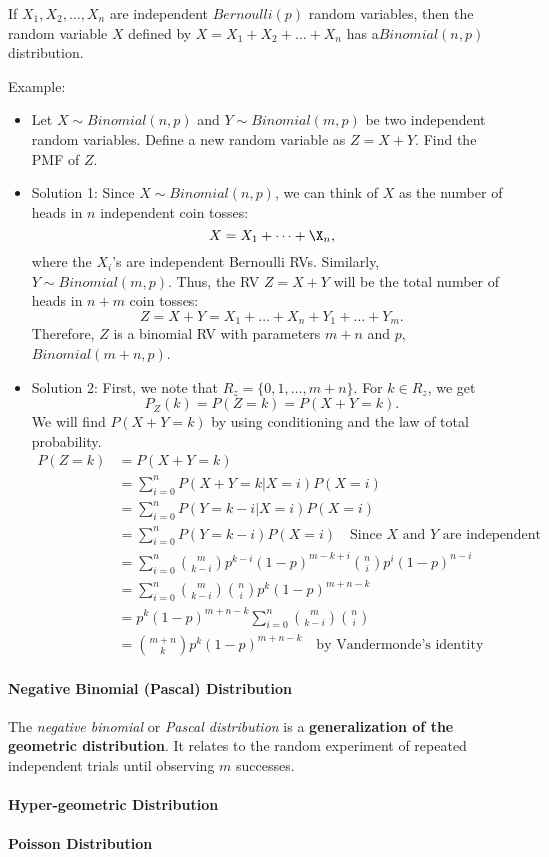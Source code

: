 If $X_1,X_2,\dots,X_n$ are independent $Bernoulli(p)$ random variables, then the random variable $X$ defined by $X=X_1+X_2+\dots+X_n$ has a$Binomial(n,p)$ distribution. 


Example: 
\begin{itemize}
	\item Let $X\sim Binomial(n,p)$ and $Y\sim Binomial(m,p)$ be two independent random variables. Define a new random variable as $Z=X+Y$. Find the PMF of $Z$.
	\item Solution 1: Since $X\sim Binomial(n,p)$, we can think of $X$ as the number of heads in $n$ independent coin tosses: 
	$$X = X_1+\dots+\X_n,$$
	where the $X_i$'s are independent Bernoulli RVs. Similarly, $Y\sim Binomial(m,p)$.
	Thus, the RV $Z=X+Y$ will be the total number of heads in $n+m$ coin tosses:
	$$Z = X+Y=X_1+\dots+X_n+Y_1+\dots+Y_m.$$
	Therefore, $Z$ is a binomial RV with parameters $m+n$ and $p$, \ie $Binomial(m+n, p)$.
	\item Solution 2: First, we note that $R_z = \{0,1,\dots,m+n\}$. For $k\in R_z$, we get
		$$P_Z(k) = P(Z=k) = P(X+Y=k).$$
		We will find $P(X+Y=k)$ by using conditioning and the law of total probability. 
		\begin{align*}
			P(Z=k) &= P(X+Y=k)\\
				   &= \sum_{i=0}^{n}P(X+Y=k|X=i)P(X=i)\\
				   &= \sum_{i=0}^{n}P(Y=k-i|X=i)P(X=i)\\
				   &= \sum_{i=0}^{n}P(Y=k-i)P(X=i)\quad \text{Since $X$ and $Y$ are independent}\\
				   &= \sum_{i=0}^{n}\binom{m}{k-i}p^{k-i}(1-p)^{m-k+i}\binom{n}{i}p^i(1-p)^{n-i}\\
				   &= \sum_{i=0}^{n}\binom{m}{k-i}\binom{n}{i}p^k(1-p)^{m+n-k}\\
				   &= p^k(1-p)^{m+n-k}\sum_{i=0}^{n}\binom{m}{k-i}\binom{n}{i}\\
				   &= \binom{m+n}{k}p^k(1-p)^{m+n-k}\quad \text{by Vandermonde's identity}
		\end{align*}
\end{itemize}

\paragraph{Negative Binomial (Pascal) Distribution}
The \textit{negative binomial} or \textit{Pascal distribution} is a \textbf{generalization of the geometric distribution}. It relates to the random experiment of repeated independent trials until observing $m$ successes.

\paragraph{Hyper-geometric Distribution}
\paragraph{Poisson Distribution}


